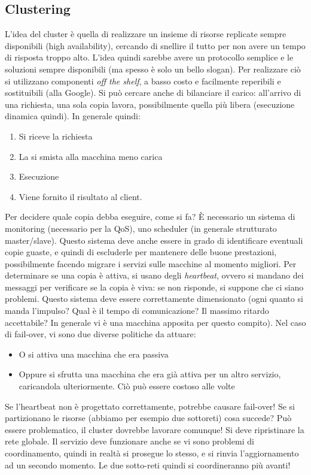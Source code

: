 \subsection{Clustering}
L'idea del cluster è quella di realizzare un insieme di risorse replicate sempre disponibili (high availability),
cercando di snellire il tutto per non avere un tempo di risposta troppo alto. L'idea quindi sarebbe avere un protocollo
semplice e le soluzioni sempre disponibili (ma spesso è solo un bello slogan).
Per realizzare ciò si utilizzano componenti \textit{off the shelf}, a basso costo e facilmente reperibili e 
sostituibili (alla Google). Si può cercare anche di bilanciare il carico: all'arrivo di una richiesta, una sola copia
lavora, possibilmente quella più libera (esecuzione dinamica quindi). In generale quindi:
\begin{enumerate}
 \item Si riceve la richiesta
 \item La si smista alla macchina meno carica
 \item Esecuzione
 \item Viene fornito il risultato al client.
\end{enumerate}
Per decidere quale copia debba eseguire, come si fa? È necessario un sistema di monitoring (necessario per la QoS), 
uno scheduler (in generale strutturato master/slave). Questo sistema deve anche essere in grado di identificare
eventuali copie guaste, e quindi di escluderle per mantenere delle buone prestazioni, possibilmente facendo migrare i
servizi sulle macchine al momento migliori. Per determinare se una copia è attiva, si usano degli \textit{heartbeat},
ovvero si mandano dei messaggi per verificare se la copia è viva: se non risponde, si suppone che ci siano problemi.
Questo sistema deve essere correttamente dimensionato (ogni quanto si manda l'impulso? Qual è il tempo di 
comunicazione? Il massimo ritardo accettabile? In generale vi è una macchina apposita per questo compito).
Nel caso di fail-over, vi sono due diverse politiche da attuare:
\begin{itemize}
 \item O si attiva una macchina che era passiva
 \item Oppure si sfrutta una macchina che era già attiva per un altro servizio, caricandola ulteriormente. Ciò può
 essere costoso alle volte
\end{itemize}
Se l'heartbeat non è progettato correttamente, potrebbe causare fail-over!
Se si partizionano le risorse (abbiamo per esempio due sottoreti) cosa succede? Può essere problematico, il cluster
dovrebbe lavorare comunque! Si deve ripristinare la rete globale. Il servizio deve funzionare anche se vi sono problemi
di coordinamento, quindi in realtà si prosegue lo stesso, e si rinvia l'aggiornamento ad un secondo momento. Le due
sotto-reti quindi si coordineranno più avanti!
